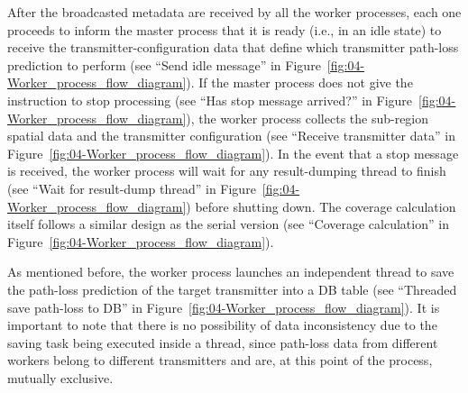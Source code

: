After the broadcasted metadata are received by all the worker processes,
each one proceeds to inform the master process that it is ready (i.e.,
in an idle state) to receive the transmitter-configuration data that
define which transmitter path-loss prediction to perform (see ``Send
idle message'' in Figure~\ref{fig:04-Worker_process_flow_diagram}).
If the master process does not give the instruction to stop processing
(see ``Has stop message arrived?'' in Figure~\ref{fig:04-Worker_process_flow_diagram}),
the worker process collects the sub-region spatial data and the transmitter
configuration (see ``Receive transmitter data'' in Figure~\ref{fig:04-Worker_process_flow_diagram}).
In the event that a stop message is received, the worker process will
wait for any result-dumping thread to finish (see ``Wait for result-dump
thread'' in Figure~\ref{fig:04-Worker_process_flow_diagram}) before
shutting down. The coverage calculation itself follows a similar design
as the serial version (see ``Coverage calculation'' in Figure~\ref{fig:04-Worker_process_flow_diagram}).

As mentioned before, the worker process launches an independent thread
to save the path-loss prediction of the target transmitter into a
DB table (see ``Threaded save path-loss to DB'' in Figure~\ref{fig:04-Worker_process_flow_diagram}).
It is important to note that there is no possibility of data inconsistency
due to the saving task being executed inside a thread, since path-loss
data from different workers belong to different transmitters and are,
at this point of the process, mutually exclusive.

